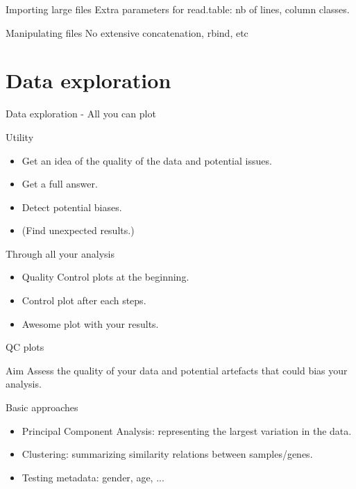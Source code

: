 \documentclass[10pt]{beamer}
\begin{document}
\begin{frame}{Importing large files}
  Extra parameters for read.table: nb of lines, column classes.
\end{frame}

\begin{frame}{Manipulating files}
  No extensive concatenation, rbind, etc
\end{frame}




\section{Data exploration}

\begin{frame}{Data exploration - All you can plot}
  \begin{block}{Utility}
    \begin{itemize}
    \item Get an idea of the quality of the data and potential issues.
    \item Get a full answer.
    \item Detect potential biases.
    \item (Find unexpected results.)
    \end{itemize}
  \end{block}
  
  \begin{block}{Through all your analysis}
    \begin{itemize}
    \item Quality Control plots at the beginning.
    \item Control plot after each steps.
    \item Awesome plot with your results.
    \end{itemize}
  \end{block}
\end{frame}

\begin{frame}{QC plots}
  \begin{block}{Aim}
    Assess the quality of your data and potential artefacts that could bias your analysis.
  \end{block}
  \begin{block}{Basic approaches}
    \begin{itemize}
    \item Principal Component Analysis: representing the largest variation in the data.
    \item Clustering: summarizing similarity relations between samples/genes.
    \item Testing metadata: gender, age, ...
    \end{itemize}
  \end{block}
\end{frame}
\end{document}
